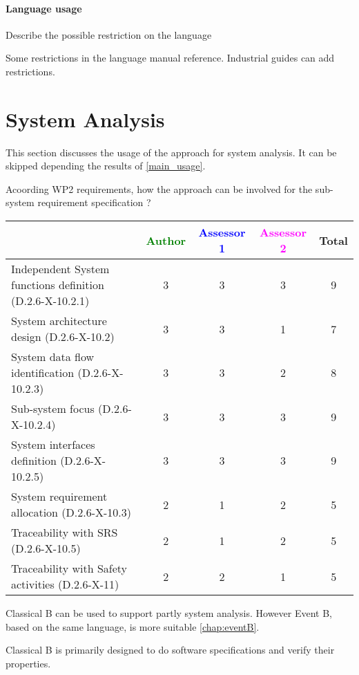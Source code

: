 \paragraph{Language usage} Describe the possible restriction on the language
\begin{author_comment}
Some restrictions in the language manual reference. Industrial guides can add restrictions.
\end{author_comment}

\section{System Analysis}
This section discusses the usage of the approach for system analysis.
It can be skipped depending the results of \ref{main_usage}.

Acoording WP2 requirements, how the approach can be involved for the sub-system requirement specification ?

\begin{tabular}{|l | c | c | c | c|}
\hline
& \textcolor{green}{Author} & \textcolor{blue}{Assessor 1} & \textcolor{magenta}{Assessor 2} & Total \\
\hline
Independent System functions definition (D.2.6-X-10.2.1)  & 3 & 3 & 3 & 9 \\
\hline 
System architecture design (D.2.6-X-10.2) & 3 & 3 & 1 & 7 \\
\hline
System data flow identification (D.2.6-X-10.2.3)  & 3 & 3 & 2 & 8 \\
\hline
Sub-system focus (D.2.6-X-10.2.4)  & 3 & 3 & 3 & 9 \\
\hline
System interfaces definition (D.2.6-X-10.2.5)  & 3 & 3 & 3 & 9 \\
\hline
System requirement allocation (D.2.6-X-10.3)  & 2 & 1 & 2 & 5 \\
\hline
Traceability with SRS (D.2.6-X-10.5)  & 2 & 1 & 2 & 5 \\
\hline
Traceability with Safety activities (D.2.6-X-11)  & 2 & 2 & 1 & 5 \\
\hline
\end{tabular}

\begin{author_comment}
Classical B can be used to  support partly  system analysis. However Event B, based on the same language, is more suitable \ref{chap:eventB}.
\end{author_comment}

\begin{assessor2}
Classical B is primarily designed to do software specifications and verify their properties.
\end{assessor2}

